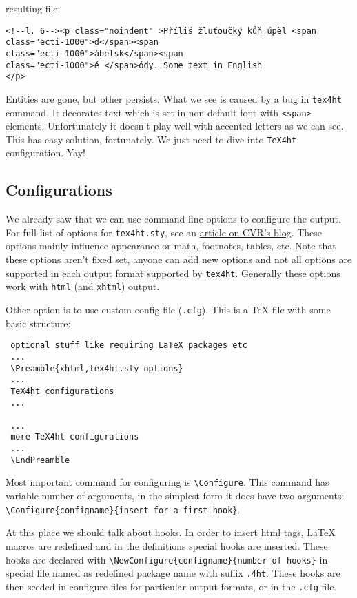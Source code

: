 resulting file:

\begin{verbatim}
<!--l. 6--><p class="noindent" >Příliš žluťoučký kůň úpěl <span 
class="ecti-1000">ď</span><span 
class="ecti-1000">ábelsk</span><span 
class="ecti-1000">é </span>ódy. Some text in English
</p> 
\end{verbatim}

Entities are gone, but other persists. What we see is caused by a bug in
\texttt{tex4ht} command. It decorates text which is set in non-default
font with \texttt{\textless{}span\textgreater{}} elements. Unfortunately
it doesn't play well with accented letters as we can see. This has easy
solution, fortunately. We just need to dive into \texttt{TeX4ht}
configuration. Yay!

\hypertarget{configurations}{%
\subsection{Configurations}\label{configurations}}

We already saw that we can use command line options to configure the
output. For full list of options for \texttt{tex4ht.sty}, see an
\href{http://www.cvr.cc/?p=504}{article on CVR's blog}. These options
mainly influence appearance or math, footnotes, tables, etc. Note that
these options aren't fixed set, anyone can add new options and not all
options are supported in each output format supported by
\texttt{tex4ht}. Generally these options work with \texttt{html} (and
\texttt{xhtml}) output.

Other option is to use custom config file (\texttt{.cfg}). This is a TeX
file with some basic structure:

\begin{verbatim}
 optional stuff like requiring LaTeX packages etc
 ...
 \Preamble{xhtml,tex4ht.sty options}
 ...
 TeX4ht configurations
 ...
  
 ...
 more TeX4ht configurations
 ...
 \EndPreamble
\end{verbatim}

Most important command for configuring is
\texttt{\textbackslash{}Configure}. This command has variable number of
arguments, in the simplest form it does have two arguments:
\texttt{\textbackslash{}Configure\{configname\}\{insert\ for\ a\ first\ hook\}}.

At this place we should talk about hooks. In order to insert html tags,
LaTeX macros are redefined and in the definitions special hooks are
inserted. These hooks are declared with
\texttt{\textbackslash{}NewConfigure\{configname\}\{number\ of\ hooks\}}
in special file named as redefined package name with suffix
\texttt{.4ht}. These hooks are then seeded in configure files for
particular output formats, or in the \texttt{.cfg} file.

